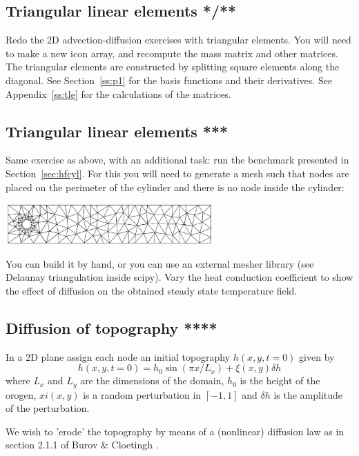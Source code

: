 \subsection{Triangular linear elements */**}

Redo the 2D advection-diffusion exercises with triangular elements.
You will need to make a new icon array, and recompute the mass matrix 
and other matrices. The triangular elements are constructed by splitting 
square elements along the diagonal.
See Section~\ref{ss:p1} for the basis functions and their derivatives.
See Appendix~\ref{ss:tle} for the calculations of the matrices.  

\subsection{Triangular linear elements ***}

Same exercise as above, with an additional task: run the benchmark
presented in Section~\ref{sec:hfcyl}.
For this you will need to generate a mesh 
such that nodes are placed on the perimeter of the cylinder and there is 
no node inside the cylinder:

\includegraphics[width=8cm]{images/compgeo/hole}

You can build it 
by hand, or you can use an external mesher library (see Delaunay triangulation inside scipy).
Vary the heat conduction coefficient to show the effect of diffusion on the obtained
steady state temperature field.  



\subsection{Diffusion of topography ****}

In a 2D plane assign each node an initial topography $h(x,y,t=0)$ given by 
\[
h(x,y,t=0)= h_0 \sin(\pi x/L_x) + \xi(x,y) \delta h
\]
where $L_x$ and $L_y$ are the dimensions of the domain, $h_0$ is the 
height of the orogen, $xi(x,y)$ is a random perturbation in $[-1,1]$
and $\delta h$ is the amplitude of the perturbation.

We wish to 'erode' the topography by means of a (nonlinear) diffusion law
as in section 2.1.1 of Burov \& Cloetingh \cite{bucl97}.

